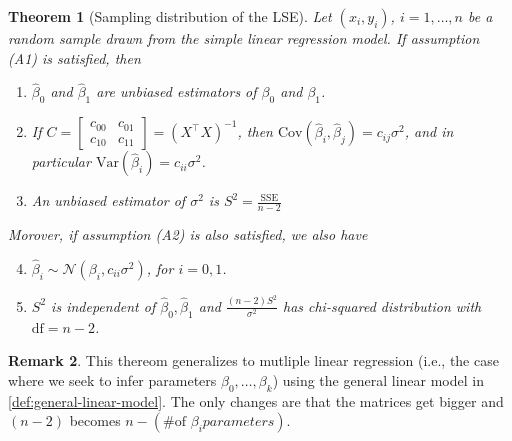 \documentclass[10pt]{article}
\newtheorem{theorem}{Theorem}
\theoremstyle{definition}
\newtheorem{remark}[theorem]{Remark}
\newcommand{\1}[1]{\textbf{1}_{\left[#1\right]}} %
\def\Var{\mathrm{Var}} %
\def\Cov{\mathrm{Cov}} %
\begin{document}
\begin{theorem}[Sampling distribution of the LSE]
  \label{thm:sampling-distribution-of-LSE-for-simple-linear-regression}
  Let $(x_{i},y_{i})$, $i=1,\ldots,n$ be a random sample drawn from the simple
  linear regression model. If assumption (A1) is satisfied, then
  \begin{enumerate}
    \item $\widehat{\beta}_{0}$ and $\widehat{\beta}_{1}$ are unbiased
    estimators of $\beta_{0}$ and $\beta_{1}$.  
    \item If $C  =
    \begin{bmatrix}
      c_{00}&c_{01}\\
      c_{10}&c_{11}
    \end{bmatrix}
    = (X^{\top}X)^{-1}$, then
    $\Cov(\widehat{\beta}_{i},\widehat{\beta}_{j})= c_{ij}\sigma^{2}$, and in
    particular $\Var(\widehat{\beta}_{i})=c_{ii}\sigma^{2}$.
    \item An unbiased estimator of $\sigma^{2}$ is $S^{2}=\frac{\mathrm{SSE}}{n-2}$
  \end{enumerate}
  Morover, if assumption (A2) is also satisfied, we also have
  \begin{enumerate}
    \setcounter{enumi}{3}
    \item $\widehat{\beta}_{i}\sim \mathcal{N}(\beta_{i}, c_{ii}\sigma^{2})$,
    for $i=0,1$.
    \item \label{item:LSE-6} $S^{2}$ is independent of $\widehat{\beta}_{0},\widehat{\beta}_{1}$
    and $\frac{(n-2)S^{2}}{\sigma^{2}}$ has chi-squared distribution with $\text{df}=n-2$.
  \end{enumerate}
\end{theorem}


\begin{remark}
  This thereom generalizes to mutliple linear regression (i.e., the case where
  we seek to infer parameters $\beta_{0},\ldots,\beta_{k}$) using the general
  linear model in \cref{def:general-linear-model}. The only changes are that
  the matrices get bigger and $(n-2)$ becomes $n - (\text{\# of }\beta_{i}{ parameters})$.
\end{remark}
\end{document}
